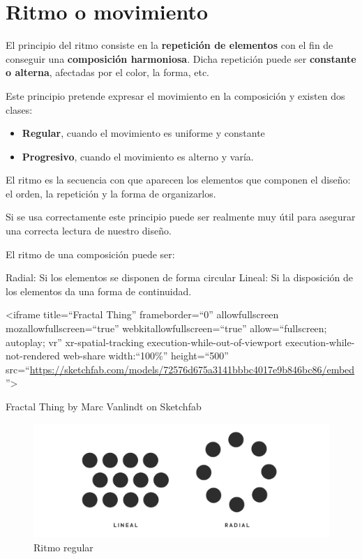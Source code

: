 \documentclass[
  16pt,
]{krantz}
\providecommand{\tightlist}{%
  \setlength{\itemsep}{0pt}\setlength{\parskip}{0pt}}
\theoremstyle{definition}
\theoremstyle{definition}
\theoremstyle{definition}
\theoremstyle{definition}
\theoremstyle{remark}
\begin{document}
\hypertarget{ritmo-o-movimiento}{%
\section{Ritmo o movimiento}\label{ritmo-o-movimiento}}

El principio del ritmo consiste en la \textbf{repetición de elementos} con el fin de conseguir una \textbf{composición harmoniosa}. Dicha repetición puede ser \textbf{constante o alterna}, afectadas por el color, la forma, etc.

Este principio pretende expresar el movimiento en la composición y existen dos clases:

\begin{itemize}
\tightlist
\item
  \textbf{Regular}, cuando el movimiento es uniforme y constante
\item
  \textbf{Progresivo}, cuando el movimiento es alterno y varía.
\end{itemize}

El ritmo es la secuencia con que aparecen los elementos que componen el diseño: el orden, la repetición y la forma de organizarlos.

Si se usa correctamente este principio puede ser realmente muy útil para asegurar una correcta lectura de nuestro diseño.

El ritmo de una composición puede ser:

Radial: Si los elementos se disponen de forma circular Lineal: Si la disposición de los elementos da una forma de continuidad.

\textless iframe title=``Fractal Thing'' frameborder=``0'' allowfullscreen mozallowfullscreen=``true'' webkitallowfullscreen=``true'' allow=``fullscreen; autoplay; vr'' xr-spatial-tracking execution-while-out-of-viewport execution-while-not-rendered web-share width:``100\%'' height=``500'' src=``\url{https://sketchfab.com/models/72576d675a3141bbbc4017e9b846bc86/embed}''\textgreater{}

Fractal Thing by Marc Vanlindt on Sketchfab

\begin{figure}

{\centering \includegraphics[width=1\linewidth,height=1\textheight]{ritmo} 

}

\caption{Ritmo regular}\label{fig:ritmo}
\end{figure}
\end{document}
